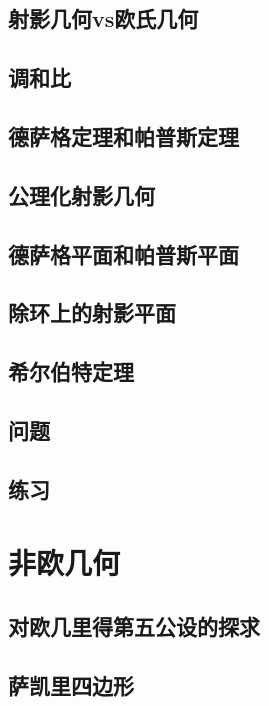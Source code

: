 \documentclass[cn,fancy,blue,11pt]{elegantbook}
\begin{document}
\section{射影几何vs欧氏几何}

\section{调和比}

\section{德萨格定理和帕普斯定理}

\section{公理化射影几何}

\section{德萨格平面和帕普斯平面}

\section{除环上的射影平面}

\section{希尔伯特定理}

\section{问题}

\section{练习}

\chapter{非欧几何}

\section{对欧几里得第五公设的探求}

\section{萨凯里四边形}
\end{document}
